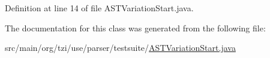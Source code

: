 Definition at line 14 of file A\-S\-T\-Variation\-Start.\-java.



The documentation for this class was generated from the following file\-:\begin{DoxyCompactItemize}
\item 
src/main/org/tzi/use/parser/testsuite/\hyperlink{_a_s_t_variation_start_8java}{A\-S\-T\-Variation\-Start.\-java}\end{DoxyCompactItemize}
